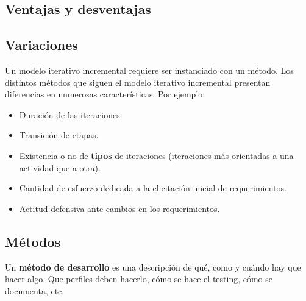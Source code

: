 \documentclass[]{article}
\begin{document}
\subsection{Ventajas y desventajas}

\subsection{Variaciones}
Un modelo iterativo incremental requiere ser instanciado con un método. Los distintos métodos que siguen el modelo iterativo incremental presentan diferencias en numerosas características. Por ejemplo:
\begin{itemize}
	\item Duración de las iteraciones.
	\item Transición de etapas.
	\item Existencia o no de \textbf{tipos} de iteraciones (iteraciones más orientadas a una actividad que a otra).
	\item Cantidad de esfuerzo dedicada a la elicitación inicial de requerimientos.
	\item Actitud defensiva ante cambios en los requerimientos.
\end{itemize}

\subsection{Métodos}
Un \textbf{método de desarrollo} es una descripción de qué, como y cuándo hay que hacer algo. Que perfiles deben hacerlo, cómo se hace el testing, cómo se documenta, etc.
\end{document}

